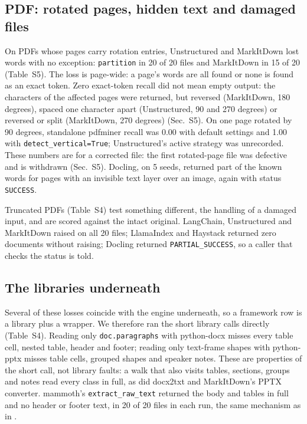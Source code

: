 \documentclass[aps,pre,twocolumn,superscriptaddress,nofootinbib,10pt]{revtex4-2}
\begin{document}
\subsection{PDF: rotated pages, hidden text and damaged files}
On PDFs whose pages carry rotation entries, Unstructured and MarkItDown lost words with no exception: \texttt{partition} in 20 of 20 files and MarkItDown in 15 of 20 (Table~S5). The loss is page-wide: a page's words are all found or none is found as an exact token. Zero exact-token recall did not mean empty output: the characters of the affected pages were returned, but reversed (MarkItDown, 180 degrees), spaced one character apart (Unstructured, 90 and 270 degrees) or reversed or split (MarkItDown, 270 degrees) (Sec.~S5). On one page rotated by 90 degrees, standalone pdfminer recall was 0.00 with default settings and 1.00 with \texttt{detect\_vertical=True}; Unstructured's active strategy was unrecorded. These numbers are for a corrected file: the first rotated-page file was defective and is withdrawn (Sec.~S5). Docling, on 5 seeds, returned part of the known words for pages with an invisible text layer over an image, again with status \texttt{SUCCESS}.

Truncated PDFs (Table~S4) test something different, the handling of a damaged input, and are scored against the intact original. LangChain, Unstructured and MarkItDown raised on all 20 files; LlamaIndex and Haystack returned zero documents without raising; Docling returned \texttt{PARTIAL\_SUCCESS}, so a caller that checks the status is told.

\subsection{The libraries underneath}
Several of these losses coincide with the engine underneath, so a framework row is a library plus a wrapper. We therefore ran the short library calls directly (Table~S4). Reading only \texttt{doc.paragraphs} with python-docx misses every table cell, nested table, header and footer; reading only text-frame shapes with python-pptx misses table cells, grouped shapes and speaker notes. These are properties of the short call, not library faults: a walk that also visits tables, sections, groups and notes read every class in full, as did docx2txt and MarkItDown's PPTX converter. mammoth's \texttt{extract\_raw\_text} returned the body and tables in full and no header or footer text, in 20 of 20 files in each run, the same mechanism as in \cite{zhao2026}.
\end{document}
